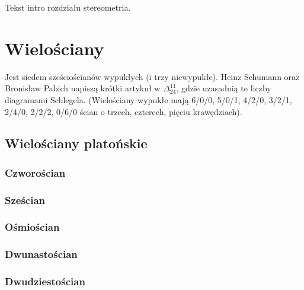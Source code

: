 
Tekst intro rozdziału stereometria.

\section{Wielościany}

Jest siedem sześciościanów wypukłych (i trzy niewypukłe).
Heinz Schumann oraz Bronisław Pabich napiszą krótki artykuł w $\Delta_{24}^{11}$, gdzie uzasadnią te liczby diagramami Schlegela.
%
(Wielościany wypukłe mają 6/0/0, 5/0/1, 4/2/0, 3/2/1, 2/4/0, 2/2/2, 0/6/0 ścian o trzech, czterech, pięciu krawędziach).

\subsection{Wielościany platońskie}
\subsubsection{Czworościan}
\subsubsection{Sześcian}
\subsubsection{Ośmiościan}
\subsubsection{Dwunastościan}
\subsubsection{Dwudziestościan}

